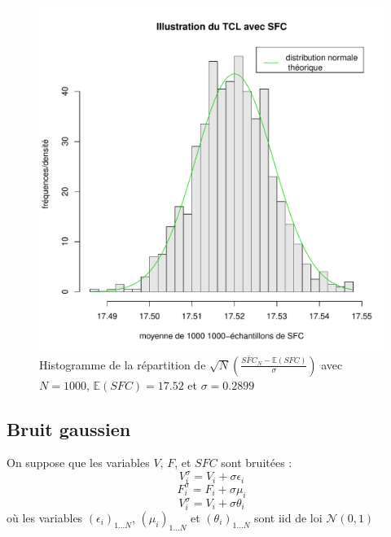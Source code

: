 \documentclass{article}
\begin{document}
\begin{figure}[!h]
\begin{center}
    \includegraphics[scale=0.7]{TCLv2_SFC.pdf}
    \caption{Histogramme de la répartition de $\sqrt{N}\left(\frac{\bar{SFC}_{N}-\mathbb{E}(SFC)}{\sigma}\right)$ avec $N=1000$, $\mathbb{E}(SFC)=17.52$ et $\sigma=0.2899$}
    \label{TCL_SFC}
\end{center}
\end{figure}


\subsection{Bruit gaussien}
On suppose que les variables $V$, $F$, et $SFC$ sont bruitées :  
\[V_{i}^{\sigma} = V_i + \sigma \epsilon _i\]
\[F_{i}^{\sigma} = F_i + \sigma \mu _i\]
\[V_{i}^{\sigma} = V_i + \sigma \theta _i\]
où les variables $(\epsilon _i)_{1...N}$, $(\mu _i)_{1...N}$ et $(\theta _i)_{1...N}$ sont iid de loi $\mathcal{N}(0,1)$
\end{document}
